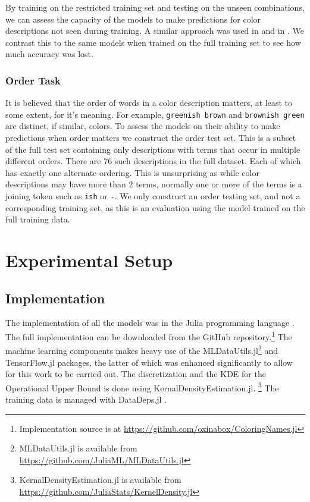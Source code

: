 \documentclass[]{clv3}
\newcommand{\parencite}{\citep}
\newcommand{\textcite}{\citet}
\newcommand{\natlang}[1]{\texttt{#1}}
\begin{document}
By training on the restricted training set and testing on the unseen combinations, we can assess the capacity of the models to make predictions for color descriptions not seen during training.
A similar approach was used in \textcite{acl2018WinnLighter} and in \textcite{DBLP:journals/corr/AtzmonBKGC16}.
We contrast this to the same models when trained on the full training set to see how much accuracy was lost.


\subsubsection{Order Task}
It is believed that the order of words in a color description matters, at least to some extent, for it's meaning.
For example, \natlang{greenish brown} and \natlang{brownish green} are distinct, if similar, colors.
To assess the models on their ability to make predictions when order matters we construct the order test set.
This is a subset of the full test set containing only descriptions with terms that occur in multiple different orders.
There are 76 such descriptions in the full dataset.
Each of which has exactly one alternate ordering.
This is unsurprising as while color descriptions may have more than 2 terms, normally one or more of the terms is a joining token such as \natlang{ish} or \natlang{-}.
We only construct an order testing set, and not a corresponding training set, as this is an evaluation using the model trained on the full training data.




\section{Experimental Setup}

\subsection{Implementation}
The implementation of all the models was in the Julia programming language \parencite{Julia}.
The full implementation can be downloaded from the GitHub repository.\footnote{Implementation source is at \url{https://github.com/oxinabox/ColoringNames.jl}}
The machine learning components makes heavy use of the MLDataUtils.jl\footnote{MLDataUtils.jl is available from \url{https://github.com/JuliaML/MLDataUtils.jl}} and TensorFlow.jl \parencite{TensorFlowJulia}
 packages,
the latter of which was enhanced significantly to allow for this work to be carried out.
The discretization and the KDE for the Operational Upper Bound is done using KernalDensityEstimation.jl.%
\footnote{KernalDensityEstimation.jl  is available from \url{https://github.com/JuliaStats/KernelDensity.jl}}
The training data is managed with DataDeps.jl \parencite{2018arXiv180801091W}.
\end{document}
